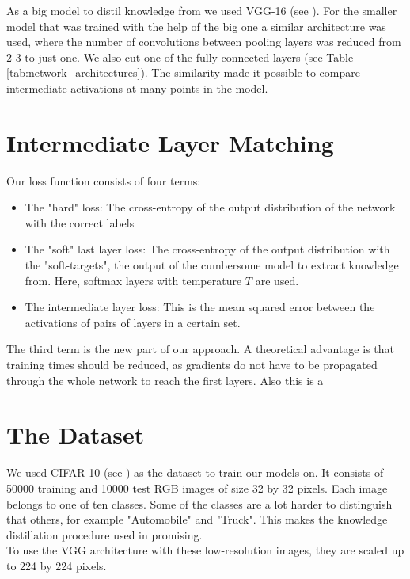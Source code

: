 \documentclass[]{scrartcl}
\begin{document}
As a big model to distil knowledge from we used VGG-16 (see \cite{DBLP:journals/corr/SimonyanZ14a}). For the smaller model that was trained with the help of the big one a similar architecture was used, where the number of convolutions between pooling layers was reduced from 2-3 to just one. We also cut one of the fully connected layers (see Table \ref{tab:network_architectures}). The similarity made it possible to compare intermediate activations at many points in the model.



\section{Intermediate Layer Matching}

Our loss function consists of four terms:
\begin{itemize}
	\item The "hard" loss: The cross-entropy of the output distribution of the network with the correct labels
	\item The "soft" last layer loss: The cross-entropy of the output distribution with the "soft-targets", the output of the cumbersome model to extract knowledge from. Here, softmax layers with temperature $ T $ are used.
	\item The intermediate layer loss: This is the mean squared error between the activations of pairs of layers in a certain set.
\end{itemize}
The third term is the new part of our approach. A theoretical advantage is that training times should be reduced, as gradients do not have to be propagated through the whole network to reach the first layers. Also this is a 





\section{The Dataset}

We used CIFAR-10 (see \cite{krizhevsky2009learning}) as the dataset to train our models on. It consists of 50000 training and 10000 test RGB images of size 32 by 32 pixels. Each image belongs to one of ten classes. Some of the classes are a lot harder to distinguish that others, for example "Automobile" and "Truck". This makes the knowledge distillation procedure used in \cite{hinton2015distilling} promising. \\
To use the VGG architecture with these low-resolution images, they are scaled up to 224 by 224 pixels.
\end{document}
